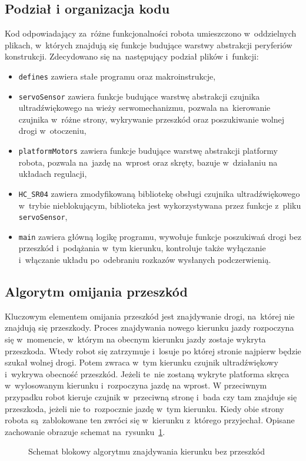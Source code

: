 \documentclass[11pt]{article}
\begin{document}
\subsection{Podział i organizacja kodu}
Kod odpowiadający za~różne funkcjonalności robota umieszczono w~oddzielnych plikach, w~których znajdują się funkcje budujące warstwy abstrakcji peryferiów konstrukcji. Zdecydowano się na~następujący podział plików i~funkcji:
\begin{itemize}
	\item \texttt{defines} zawiera stałe programu oraz makroinstrukcje,
	\item \texttt{servoSensor} zawiera funkcje budujące warstwę abstrakcji czujnika ultradźwiękowego na wieży serwomechanizmu, pozwala na~kierowanie czujnika w~różne strony, wykrywanie przeszkód oraz poszukiwanie wolnej drogi w~otoczeniu,
	\item \texttt{platformMotors} zawiera funkcje budujące warstwę abstrakcji platformy robota, pozwala na~jazdę na~wprost oraz skręty, bazuje w~działaniu na układach regulacji,
	\item \verb|HC_SR04| zawiera zmodyfikowaną bibliotekę obsługi czujnika ultradźwiękowego w~trybie nieblokującym, biblioteka jest wykorzystywana przez funkcje z~pliku \texttt{servoSensor},
	\item \texttt{main} zawiera główną logikę programu, wywołuje funkcje poszukiwań drogi bez przeszkód i~podążania w~tym kierunku, kontroluje także wyłączanie i~włączanie układu po~odebraniu rozkazów wysłanych podczerwienią.
\end{itemize}

\subsection{Algorytm omijania przeszkód}
Kluczowym elementem omijania przeszkód jest znajdywanie drogi, na~której nie znajdują się przeszkody.
Proces znajdywania nowego kierunku jazdy rozpoczyna się w~momencie, w~którym na obecnym kierunku jazdy zostaje wykryta przeszkoda.
Wtedy robot się zatrzymuje i~losuje po której stronie najpierw będzie szukał wolnej drogi. Potem zwraca w~tym kierunku czujnik ultradźwiękowy i~wykrywa obecność przeszkód.
Jeżeli te~nie zostaną wykryte platforma skręca w~wylosowanym kierunku i~rozpoczyna jazdę na wprost.
W przeciwnym przypadku robot kieruje czujnik w~przeciwną stronę i~bada czy tam znajduje się przeszkoda, jeżeli nie to~rozpocznie jazdę w~tym kierunku.
Kiedy obie strony robota są~zablokowane ten zwróci się w~kierunku z~którego przyjechał. Opisane zachowanie obrazuje schemat na~rysunku~\ref{fig:tikz:pathfind_flowchart}.
\begin{figure}[htbp]
	\centering
	\scalebox{0.8}{}
	\caption{Schemat blokowy algorytmu znajdywania kierunku bez przeszkód}
	\label{fig:tikz:pathfind_flowchart}
\end{figure}
\end{document}
